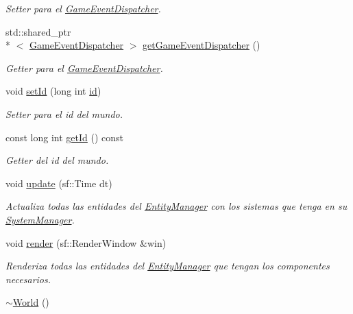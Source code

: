 \begin{DoxyCompactItemize}
\begin{DoxyCompactList}\small\item\em Setter para el \hyperlink{classant_1_1_game_event_dispatcher}{Game\+Event\+Dispatcher}. \end{DoxyCompactList}\item 
std\+::shared\+\_\+ptr\\*
$<$ \hyperlink{classant_1_1_game_event_dispatcher}{Game\+Event\+Dispatcher} $>$ \hyperlink{classant_1_1_world_aa61bcbc5deada677fa177ea8ec57932b}{get\+Game\+Event\+Dispatcher} ()
\begin{DoxyCompactList}\small\item\em Getter para el \hyperlink{classant_1_1_game_event_dispatcher}{Game\+Event\+Dispatcher}. \end{DoxyCompactList}\item 
void \hyperlink{classant_1_1_world_a17f2ce512457fec44600d614a18d2815}{set\+Id} (long int \hyperlink{classant_1_1_world_ac55101558f7c8a7ca6abcf641a4e7b1b}{id})
\begin{DoxyCompactList}\small\item\em Setter para el id del mundo. \end{DoxyCompactList}\item 
const long int \hyperlink{classant_1_1_world_a4623521708a75ec7f3d9c2f85f148a07}{get\+Id} () const 
\begin{DoxyCompactList}\small\item\em Getter del id del mundo. \end{DoxyCompactList}\item 
void \hyperlink{classant_1_1_world_a5150296483f2b6f5dc7294faa9978344}{update} (sf\+::\+Time dt)
\begin{DoxyCompactList}\small\item\em Actualiza todas las entidades del \hyperlink{classant_1_1_entity_manager}{Entity\+Manager} con los sistemas que tenga en su \hyperlink{classant_1_1_system_manager}{System\+Manager}. \end{DoxyCompactList}\item 
void \hyperlink{classant_1_1_world_aefef1819102fd2194bcea6ae73e45e35}{render} (sf\+::\+Render\+Window \&win)
\begin{DoxyCompactList}\small\item\em Renderiza todas las entidades del \hyperlink{classant_1_1_entity_manager}{Entity\+Manager} que tengan los componentes necesarios. \end{DoxyCompactList}\item 
\hyperlink{classant_1_1_world_a2db3d5ce695f1dbcc0871b38e577b031}{$\sim$\+World} ()
\end{DoxyCompactItemize}
